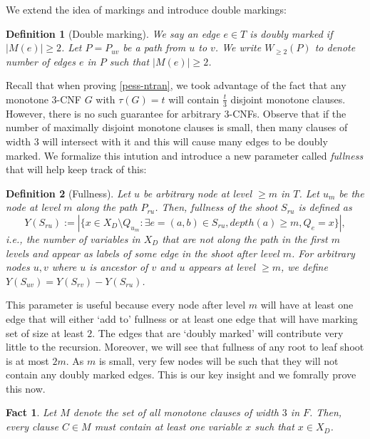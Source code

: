 \documentclass[10pt,a4paper]{article}
\newtheorem{fact}{Fact}
\newtheorem{definition}{Definition}
\newcommand{\trn}{\tau}
\newcommand{\openfunction}{Y}
\begin{document}
We extend the idea of markings and introduce double markings:

\begin{definition}[Double marking]
We say an edge $e\in T$ is doubly marked if $|M(e)| \ge 2$.
Let $P = P_{uv}$ be a path from $u$ to $v$. We write $W_{\ge 2}(P)$ to denote number of edges $e$ in $P$ such that $|M(e)| \ge 2$.
\end{definition}


Recall that when proving \cref{pess-ntran}, we took advantage of the fact that any monotone $3$-CNF $G$ with $\trn(G) = t$ will contain $\frac{t}{3}$ disjoint monotone clauses. However, there is no such guarantee for arbitrary $3$-CNFs. Observe that if the number of maximally disjoint monotone clauses is small, then many clauses of width $3$ will intersect with it and this will cause many edges to be doubly marked. We formalize this intution and introduce a new parameter called \emph{fullness} that will help keep track of this:

\begin{definition}[Fullness]
Let $u$ be arbitrary node at level $\ge m$ in $T$. Let $u_m$ be the node at level $m$ along the path $P_{ru}$. Then, \emph{fullness} of the shoot $S_{ru}$ is defined as
\[
\openfunction(S_{ru}) := |\{x\in X_D\setminus Q_{u_m}: \exists e = (a, b)\in S_{ru}, depth(a) \ge m, Q_e = x\}|,
\]
i.e., the number of variables in $X_D$ that are not along the path in the first $m$ levels and appear as labels of some edge in the shoot after level $m$. For arbitrary nodes $u, v$ where $u$ is ancestor of $v$ and $u$ appears at level $\ge m$, we define $\openfunction(S_{uv}) = \openfunction(S_{rv}) - \openfunction(S_{ru})$.
\end{definition}

This parameter is useful because every node after level $m$ will have at least one edge that will either `add to' fullness or at least one edge that will have marking set of size at least $2$. The edges that are `doubly marked' will contribute very little to the recursion. Moreover, we will see that fullness of any root to leaf shoot is at most $2m$. As $m$ is small, very few nodes will be such that they will not contain any doubly marked edges. This is our key insight and we fomrally prove this now.

\begin{fact}
\label{fact:disjoint-intersect}
   Let $M$ denote the set of all monotone clauses of width $3$ in $F$. Then, every clause $C\in M$ must contain at least one variable $x$ such that $x\in X_D$.
\end{fact}
\end{document}

